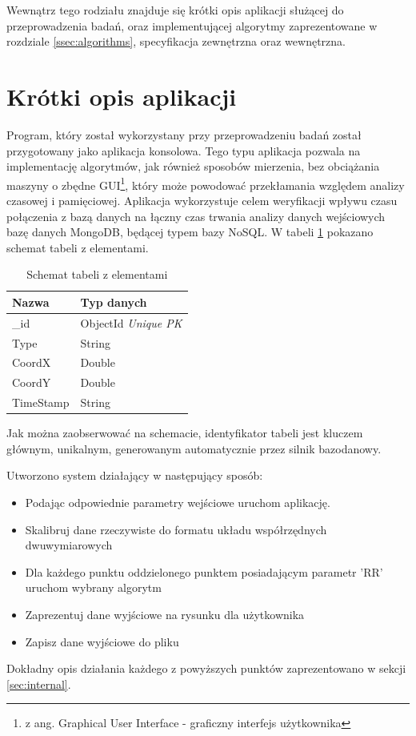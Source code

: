 Wewnątrz tego rodziału znajduje się krótki opis aplikacji służącej do przeprowadzenia badań, oraz implementującej algorytmy zaprezentowane w rozdziale \ref{ssec:algorithms}, specyfikacja zewnętrzna oraz wewnętrzna.
\section{Krótki opis aplikacji}
\label{sec:shortdesc}
Program, który został wykorzystany przy przeprowadzeniu badań został przygotowany jako aplikacja konsolowa. Tego typu aplikacja pozwala na implementację algorytmów, jak również sposobów mierzenia, bez obciążania maszyny o zbędne GUI\footnote{z ang. Graphical User Interface - graficzny interfejs użytkownika}, który może powodować przekłamania względem analizy czasowej i pamięciowej. Aplikacja wykorzystuje celem weryfikacji wpływu czasu połączenia z bazą danych na łączny czas trwania analizy danych wejściowych bazę danych MongoDB, będącej typem bazy NoSQL. W tabeli \ref{tab:nosqlschema} pokazano schemat tabeli z elementami.
\begin{table}[H]
    \centering
    \begin{tabular}{|l|l|}
    \hline
    \textbf{Nazwa} & \textbf{Typ danych} \\ \hline
    \_id           & ObjectId \textit{Unique PK} \\ \hline
    Type           & String              \\ \hline
    CoordX         & Double              \\ \hline
    CoordY         & Double              \\ \hline
    TimeStamp      & String              \\ \hline
    \end{tabular}
    \caption{Schemat tabeli z elementami}
    \label{tab:nosqlschema}
\end{table}
Jak można zaobserwować na schemacie, identyfikator tabeli jest kluczem głównym, unikalnym, generowanym automatycznie przez silnik bazodanowy.\par
Utworzono system działający w następujący sposób:
\begin{itemize}
        \item Podając odpowiednie parametry wejściowe uruchom aplikację.
        \item Skalibruj dane rzeczywiste do formatu układu współrzędnych dwuwymiarowych
        \item Dla każdego punktu oddzielonego punktem posiadającym parametr 'RR' uruchom wybrany algorytm
        \item Zaprezentuj dane wyjściowe na rysunku dla użytkownika
        \item Zapisz dane wyjściowe do pliku
\end{itemize}
Dokładny opis działania każdego z powyższych punktów zaprezentowano w sekcji \ref{sec:internal}.
